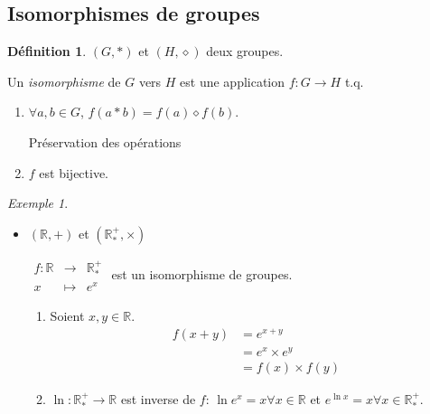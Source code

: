 \documentclass{report}
\theoremstyle{definition}
\newtheorem*{defin}{D\'efinition}
\theoremstyle{remark}
\newtheorem*{exem}{Exemple}
\begin{document}
	\subsection{Isomorphismes de groupes}
	\begin{defin}
		$(G,*)$ et $(H,\diamond)$ deux groupes.

		Un \emph{isomorphisme} de $G$ vers $H$ est une application $f:G \to H$ t.q.
		\begin{enumerate}[noitemsep]
			\item $\forall a,b \in G$, $f(a*b)=f(a)\diamond f(b)$.

			Pr\'eservation des op\'erations
			\item $f$ est bijective.
		\end{enumerate}
	\end{defin}
	\begin{exem}~

		\begin{itemize}
			\item $(\mathbb{R},+)$ et $(\mathbb{R}^+_*,\times)$

			$\begin{array}{rcl}
				f:\mathbb{R}&\to&\mathbb{R}^+_*\\
				x&\mapsto&e^x
			\end{array}$ est un isomorphisme de groupes.
			\begin{enumerate}[label=(\arabic*)]
				\item Soient $x,y \in \mathbb{R}$.
				\begin{align*}
					f(x+y)&= e^{x+y}\\
					&= e^x \times e^y\\
					&= f(x) \times f(y)
				\end{align*}
				\item $\ln:\mathbb{R}^+_* \to \mathbb{R}$ est inverse de $f$: $\ln e^x=x \forall x \in \mathbb{R}$ et $e^{\ln x}=x \forall x \in \mathbb{R}^+_*$.
			\end{enumerate}
		\end{itemize}
	\end{exem}
\end{document}
